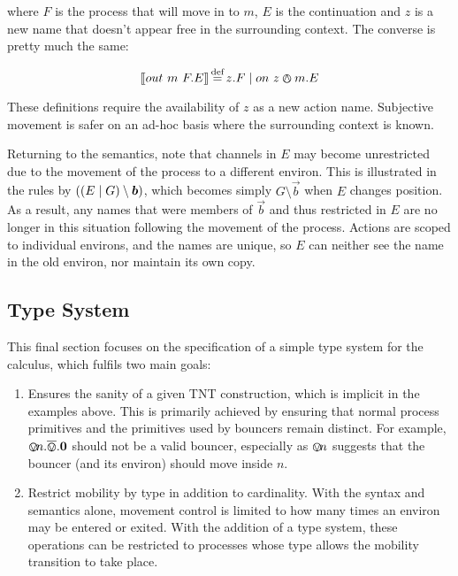 \documentclass[orivec,envcountsame]{llncs}
\begin{document}
\noindent where $F$ is the process that will move in to $m$, $E$ is
the continuation and $z$ is a new name that doesn't appear free in the
surrounding context.  The converse is pretty much the same:

\begin{equation}
[\hspace{-0.3ex}[ out\ m\ F.E ]\hspace{-0.3ex}] \operatorname{\stackrel{\textrm{def}}{=}} z.F \mid on\ z \varowedge m.E
\end{equation}

These definitions require the availability of $z$ as a new action name.
Subjective movement is safer on an ad-hoc basis where the surrounding
context is known.

Returning to the semantics, note that channels in $E$ may become
unrestricted due to the movement of the process to a different environ.
This is illustrated in the rules by $((E \pc G) \setminus \vec{b})$,
which becomes simply $G \setminus \vec{b}$ when $E$ changes position.
As a result, any names that were members of $\vec{b}$ and thus
restricted in $E$ are no longer in this situation following the movement
of the process.  Actions are scoped to individual environs, and the
names are unique, so $E$ can neither see the name in the old environ,
nor maintain its own copy.

\subsection{Type System}
\label{typesys}

This final section focuses on the specification of a simple type
system for the calculus, which fulfils two main goals:

\begin{enumerate}
\item Ensures the sanity of a given TNT construction, which is
  implicit in the examples above.  This is primarily achieved by
  ensuring that normal process primitives and the primitives used by
  bouncers remain distinct.  For example,
  $\varovee\!n.\overline{\varovee}.\textbf{0}$ should not be a valid bouncer,
  especially as $\varovee\!n$ suggests that the bouncer (and its environ)
  should move inside $n$.
\item Restrict mobility by type in addition to cardinality.  With the
  syntax and semantics alone, movement control is limited to how many
  times an environ may be entered or exited.  With the addition of a type
  system, these operations can be restricted to processes whose type
  allows the mobility transition to take place.
\end{enumerate}
\end{document}
